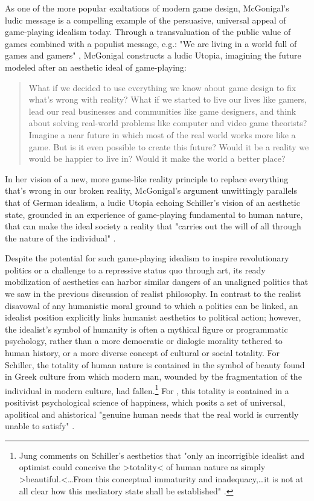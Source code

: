 As one of the more popular exaltations of modern game design, McGonigal's ludic message is a compelling example of the persuasive, universal appeal of game-playing idealism today. Through a transvaluation of the public value of games combined with a populist message, e.g.: "We are living in a world full of games and gamers" \autocite[Introduction]{McGonigal2011}, McGonigal constructs a ludic Utopia, imagining the future modeled after an aesthetic ideal of game-playing:
\blockcquote[Introduction]{McGonigal2011}{
  What if we decided to use everything we know about game design to fix what's wrong with reality? What if we started to live our lives like gamers, lead our real businesses and communities like game designers, and think about solving real-world problems like computer and video game theorists? Imagine a near future in which most of the real world works more like a game. But is it even possible to create this future? Would it be a reality we would be happier to live in? Would it make the world a better place?
}
In her vision of a new, more game-like reality principle to replace everything that's wrong in our broken reality, McGonigal's argument unwittingly parallels that of German idealism, a ludic Utopia echoing Schiller's vision of an aesthetic state, grounded in an experience of game-playing fundamental to human nature, that can make the ideal society a reality that "carries out the will of all through the nature of the individual" \autocite[138]{Schiller2004-if}.

Despite the potential for such game-playing idealism to inspire revolutionary politics or a challenge to a repressive status quo through art, its ready mobilization of aesthetics can harbor similar dangers of an unaligned politics that we saw in the previous discussion of realist philosophy. In contrast to the realist disavowal of any humanistic moral ground to which a politics can be linked, an idealist position explicitly links humanist aesthetics to political action; however, the idealist's symbol of humanity is often a mythical figure or programmatic psychology, rather than a more democratic or dialogic morality tethered to human history, or a more diverse concept of cultural or social totality. For Schiller, the totality of human nature is contained in the symbol of beauty found in Greek culture from which modern man, wounded by the fragmentation of the individual in modern culture, had fallen.\footnote{
  Jung comments on Schiller's aesthetics that "only an incorrigible idealist and optimist could conceive the >totality< of human nature as simply >beautiful.<…From this conceptual immaturity and inadequacy,…it is not at all clear how this mediatory state shall be established" \autocite[161]{Jung1923}.
  }
For \citeauthor{McGonigal2011}, this totality is contained in a positivist psychological science of happiness, which posits a set of universal, apolitical and ahistorical "genuine human needs that the real world is currently unable to satisfy" \autocite[Introduction]{McGonigal2011}.

